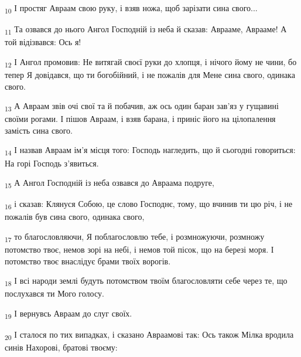 \begin{tcolorbox}
\textsubscript{10} І простяг Авраам свою руку, і взяв ножа, щоб зарізати сина свого...
\end{tcolorbox}
\begin{tcolorbox}
\textsubscript{11} Та озвався до нього Ангол Господній із неба й сказав: Аврааме, Аврааме! А той відізвався: Ось я!
\end{tcolorbox}
\begin{tcolorbox}
\textsubscript{12} І Ангол промовив: Не витягай своєї руки до хлопця, і нічого йому не чини, бо тепер Я довідався, що ти богобійний, і не пожалів для Мене сина свого, одинака свого.
\end{tcolorbox}
\begin{tcolorbox}
\textsubscript{13} А Авраам звів очі свої та й побачив, аж ось один баран зав'яз у гущавині своїми рогами. І пішов Авраам, і взяв барана, і приніс його на цілопалення замість сина свого.
\end{tcolorbox}
\begin{tcolorbox}
\textsubscript{14} І назвав Авраам ім'я місця того: Господь нагледить, що й сьогодні говориться: На горі Господь з'явиться.
\end{tcolorbox}
\begin{tcolorbox}
\textsubscript{15} А Ангол Господній із неба озвався до Авраама подруге,
\end{tcolorbox}
\begin{tcolorbox}
\textsubscript{16} і сказав: Клянуся Собою, це слово Господнє, тому, що вчинив ти цю річ, і не пожалів був сина свого, одинака свого,
\end{tcolorbox}
\begin{tcolorbox}
\textsubscript{17} то благословляючи, Я поблагословлю тебе, і розмножуючи, розмножу потомство твоє, немов зорі на небі, і немов той пісок, що на березі моря. І потомство твоє внаслідує брами твоїх ворогів.
\end{tcolorbox}
\begin{tcolorbox}
\textsubscript{18} І всі народи землі будуть потомством твоїм благословляти себе через те, що послухався ти Мого голосу.
\end{tcolorbox}
\begin{tcolorbox}
\textsubscript{19} І вернувсь Авраам до слуг своїх.
\end{tcolorbox}
\begin{tcolorbox}
\textsubscript{20} І сталося по тих випадках, і сказано Авраамові так: Ось також Мілка вродила синів Нахорові, братові твоєму:
\end{tcolorbox}
